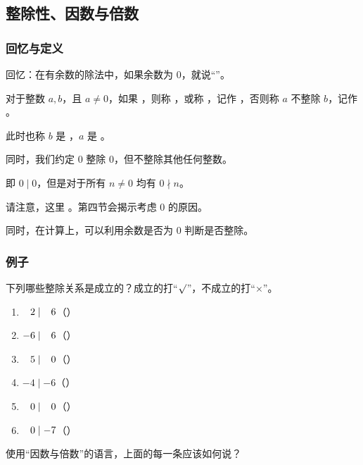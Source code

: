 \subsection{整除性、因数与倍数}
\begin{frame}[c]
  \progressnow*
\end{frame}
\begin{frame}
  \frametitle{回忆与定义}
  回忆：在有余数的除法中，如果余数为 $0$，就说“”。
  \pause
  \begin{definition}[整除、因数与倍数]
    对于整数 $a, b$，且 $a \ne 0$，如果 ，则称 ，或称 ，记作 ，否则称 $a$ 不整除 $b$，记作 。
   
    \emptyline
    此时也称 $b$ 是 ，$a$ 是 。
    \pause
    
    \emptyline
    同时，我们\alert{约定} $0$ 整除 $0$，但不整除其他任何整数。
    
    即 $0 \mid 0$，但是对于所有 $n \ne 0$ 均有 $0 \nmid n$。
  \end{definition}
  \pause
  请注意，这里 。第四节会揭示考虑 $0$ 的原因。
  \pause
  
  \emptyline
  同时，在计算上，可以利用余数是否为 $0$ 判断是否整除。
\end{frame}
\begin{frame}
  \frametitle{例子}
  下列哪些整除关系是成立的？成立的打“$\surd$”，不成立的打“$\times$”。
  \begin{enumerate}
    \item $\hphantom{-{}}2 \mid \hphantom{-{}}6$\hspace{1em}（）
    \item $-6 \mid \hphantom{-{}}6$\hspace{1em}（）
    \item $\hphantom{-{}}5 \mid \hphantom{-{}}0$\hspace{1em}（）
    \item $-4 \mid -6$\hspace{1em}（）
    \item $\hphantom{-{}}0 \mid \hphantom{-{}}0$\hspace{1em}（）
    \item $\hphantom{-{}}0 \mid -7$\hspace{1em}（）
  \end{enumerate}
  \pause\pause\pause\pause\pause\pause\pause
  \emptyline
  使用“因数与倍数”的语言，上面的每一条应该如何说？
\end{frame}
